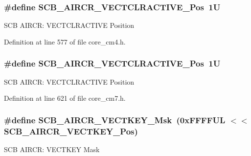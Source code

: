 \subsubsection[{\texorpdfstring{S\+C\+B\+\_\+\+A\+I\+R\+C\+R\+\_\+\+V\+E\+C\+T\+C\+L\+R\+A\+C\+T\+I\+V\+E\+\_\+\+Pos}{SCB_AIRCR_VECTCLRACTIVE_Pos}}]{\setlength{\rightskip}{0pt plus 5cm}\#define S\+C\+B\+\_\+\+A\+I\+R\+C\+R\+\_\+\+V\+E\+C\+T\+C\+L\+R\+A\+C\+T\+I\+V\+E\+\_\+\+Pos~1U}\hypertarget{group___c_m_s_i_s___s_c_b_gaa30a12e892bb696e61626d71359a9029}{}\label{group___c_m_s_i_s___s_c_b_gaa30a12e892bb696e61626d71359a9029}
S\+CB A\+I\+R\+CR\+: V\+E\+C\+T\+C\+L\+R\+A\+C\+T\+I\+VE Position 

Definition at line 577 of file core\+\_\+cm4.\+h.

\subsubsection[{\texorpdfstring{S\+C\+B\+\_\+\+A\+I\+R\+C\+R\+\_\+\+V\+E\+C\+T\+C\+L\+R\+A\+C\+T\+I\+V\+E\+\_\+\+Pos}{SCB_AIRCR_VECTCLRACTIVE_Pos}}]{\setlength{\rightskip}{0pt plus 5cm}\#define S\+C\+B\+\_\+\+A\+I\+R\+C\+R\+\_\+\+V\+E\+C\+T\+C\+L\+R\+A\+C\+T\+I\+V\+E\+\_\+\+Pos~1U}\hypertarget{group___c_m_s_i_s___s_c_b_gaa30a12e892bb696e61626d71359a9029}{}\label{group___c_m_s_i_s___s_c_b_gaa30a12e892bb696e61626d71359a9029}
S\+CB A\+I\+R\+CR\+: V\+E\+C\+T\+C\+L\+R\+A\+C\+T\+I\+VE Position 

Definition at line 621 of file core\+\_\+cm7.\+h.

\subsubsection[{\texorpdfstring{S\+C\+B\+\_\+\+A\+I\+R\+C\+R\+\_\+\+V\+E\+C\+T\+K\+E\+Y\+\_\+\+Msk}{SCB_AIRCR_VECTKEY_Msk}}]{\setlength{\rightskip}{0pt plus 5cm}\#define S\+C\+B\+\_\+\+A\+I\+R\+C\+R\+\_\+\+V\+E\+C\+T\+K\+E\+Y\+\_\+\+Msk~(0x\+F\+F\+F\+F\+U\+L $<$$<$ S\+C\+B\+\_\+\+A\+I\+R\+C\+R\+\_\+\+V\+E\+C\+T\+K\+E\+Y\+\_\+\+Pos)}\hypertarget{group___c_m_s_i_s___s_c_b_ga90c7cf0c490e7ae55f9503a7fda1dd22}{}\label{group___c_m_s_i_s___s_c_b_ga90c7cf0c490e7ae55f9503a7fda1dd22}
S\+CB A\+I\+R\+CR\+: V\+E\+C\+T\+K\+EY Mask 


